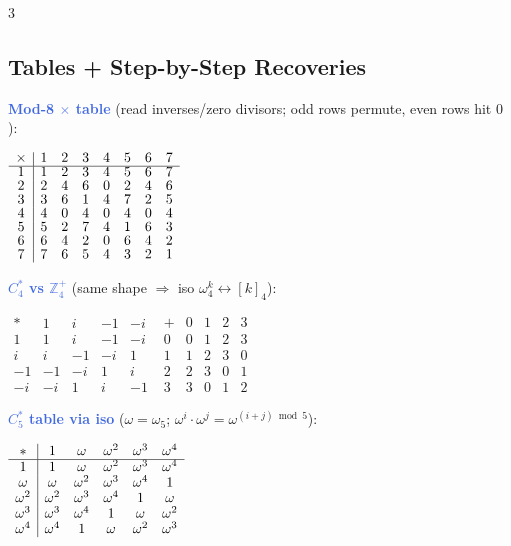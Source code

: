 \documentclass[9pt]{extarticle}
\newcommand{\ex}[1]{\textbf{\textcolor{RoyalBlue}{#1}}}
\begin{document}
\begin{multicols}{3}
\subsection{Tables + Step-by-Step Recoveries}
\begin{sloppypar}\raggedright
\ex{Mod-8 ${\times}$ table} (read inverses/zero divisors; odd rows permute, even rows hit $0$):\\
\end{sloppypar}
\begin{center}\scriptsize
${\renewcommand{\arraystretch}{0.82}\begin{array}{c|ccccccc}\times&1&2&3&4&5&6&7\\\hline1&1&2&3&4&5&6&7\\2&2&4&6&0&2&4&6\\3&3&6&1&4&7&2&5\\4&4&0&4&0&4&0&4\\5&5&2&7&4&1&6&3\\6&6&4&2&0&6&4&2\\7&7&6&5&4&3&2&1\end{array}}$
\end{center}
\begin{sloppypar}\raggedright
\ex{$C_4^*$ vs $\mathbb Z_4^+$} (same shape $\Rightarrow$ iso $\omega_4^k\leftrightarrow[k]_4$):\\
\end{sloppypar}
\begin{center}\scriptsize
$\begin{array}{c|cccc}*&1&i&{-}1&{-}i\\\hline1&1&i&{-}1&{-}i\\i&i&{-}1&{-}i&1\\{-}1&{-}1&{-}i&1&i\\{-}i&{-}i&1&i&{-}1\end{array}$\quad
$\begin{array}{c|cccc}+&0&1&2&3\\\hline0&0&1&2&3\\1&1&2&3&0\\2&2&3&0&1\\3&3&0&1&2\end{array}$
\end{center}
\begin{sloppypar}\raggedright
\ex{$C_5^*$ table via iso} ($\omega{=}\omega_5$; $\omega^i{\cdot}\omega^j{=}\omega^{(i+j)\bmod5}$):\\
\end{sloppypar}
\begin{center}\scriptsize
${\renewcommand{\arraystretch}{0.82}\begin{array}{c|ccccc}*&1&\omega&\omega^2&\omega^3&\omega^4\\\hline1&1&\omega&\omega^2&\omega^3&\omega^4\\\omega&\omega&\omega^2&\omega^3&\omega^4&1\\\omega^2&\omega^2&\omega^3&\omega^4&1&\omega\\\omega^3&\omega^3&\omega^4&1&\omega&\omega^2\\\omega^4&\omega^4&1&\omega&\omega^2&\omega^3\end{array}}$

\end{center}
\end{multicols}
\end{document}
